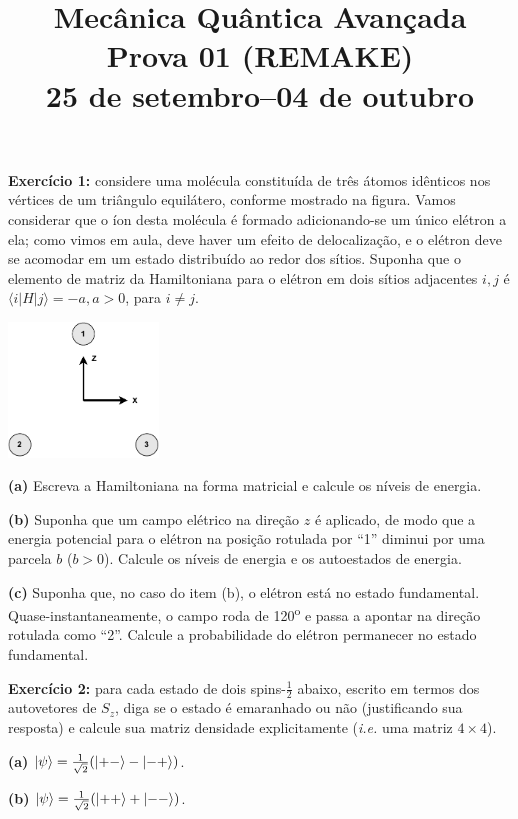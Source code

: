 \documentclass[12pt]{article}
\title{Mecânica Quântica Avançada\\%
Prova 01 (REMAKE)\\%
25 de setembro--04 de outubro}
\date{}
\begin{document}
\maketitle
\vspace*{-4em}

\textbf{Exercício 1:} considere uma molécula constituída de três átomos idênticos nos vértices de um triângulo equilátero, conforme mostrado na figura.
Vamos considerar que o íon desta molécula é formado adicionando-se um único elétron a ela;
como vimos em aula, deve haver um efeito de delocalização, e o elétron deve se acomodar em um estado distribuído ao redor dos sítios.
Suponha que o elemento de matriz da Hamiltoniana para o elétron em dois sítios adjacentes $i,j$ é $\langle i|H|j \rangle = -a, a>0$, para $i \neq j$.

\begin{center}
\includegraphics[width=0.3\textwidth]{Figures/EquilateralTriangleMolecule.drawio.pdf}
\end{center}

\textbf{(a)} Escreva a Hamiltoniana na forma matricial e calcule os níveis de energia.

\textbf{(b)} Suponha que um campo elétrico na direção $z$ é aplicado, 
de modo que a energia potencial para o elétron na posição rotulada por ``1'' diminui por uma parcela $b$ ($b > 0$).
Calcule os níveis de energia e os autoestados de energia.

\textbf{(c)} Suponha que, no caso do item (b), o elétron está no estado fundamental.
Quase-instantaneamente, o campo roda de 120\textsuperscript{o} e passa a apontar na direção rotulada como ``2''.
Calcule a probabilidade do elétron permanecer no estado fundamental.

\textbf{Exercício 2:} para cada estado de dois spins-$\frac{1}{2}$ abaixo, escrito em termos dos autovetores de $S_z$, 
diga se o estado é emaranhado ou não (justificando sua resposta) e
calcule sua matriz densidade explicitamente (\textit{i.e.} uma matriz $4\times4$).

\textbf{(a)} $\ket{\psi} = \frac{1}{\sqrt{2}}(\ket{+-}-\ket{-+})$.

\textbf{(b)} $\ket{\psi} = \frac{1}{\sqrt{2}}(\ket{++}+\ket{--})$.
\end{document}

